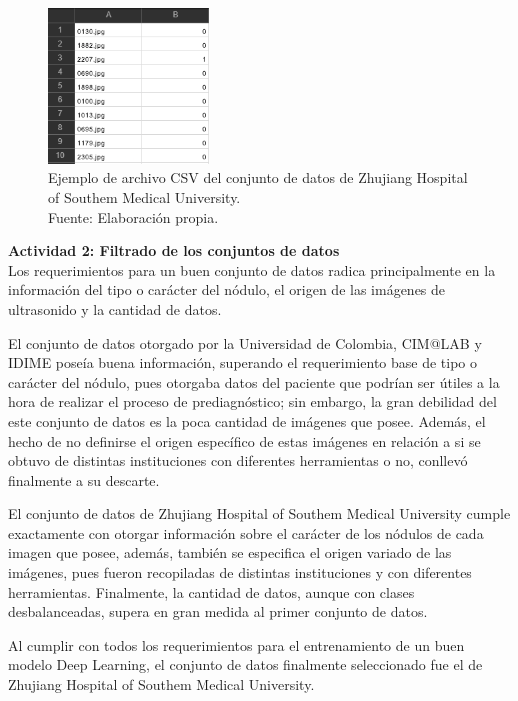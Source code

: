 \begin{figure}[H]
	\begin{center}
		\includegraphics[width=0.38\textwidth]{4/figures/tn3k_csv.PNG}
		\caption[Ejemplo de archivo CSV del conjunto de datos de Zhujiang Hospital of Southem Medical University]{Ejemplo de archivo CSV del conjunto de datos de Zhujiang Hospital of Southem Medical University. \\
		Fuente: Elaboración propia.}
		\label{4:fig105}
	\end{center}
\end{figure}

\textbf{Actividad 2: Filtrado de los conjuntos de datos}
\\
Los requerimientos para un buen conjunto de datos radica principalmente en la información del tipo o carácter del nódulo, el origen de las imágenes de ultrasonido y la cantidad de datos.

El conjunto de datos otorgado por la Universidad de Colombia, CIM@LAB y IDIME poseía buena información, superando el requerimiento base de tipo o carácter del nódulo, pues otorgaba datos del paciente que podrían ser útiles a la hora de realizar el proceso de prediagnóstico; sin embargo, la gran debilidad del este conjunto de datos es la poca cantidad de imágenes que posee. Además, el hecho de no definirse el origen específico de estas imágenes en relación a si se obtuvo de distintas instituciones con diferentes herramientas o no, conllevó finalmente a su descarte.

El conjunto de datos de Zhujiang Hospital of Southem Medical University cumple exactamente con otorgar información sobre el carácter de los nódulos de cada imagen que posee, además, también se especifica el origen variado de las imágenes, pues fueron recopiladas de distintas instituciones y con diferentes herramientas. Finalmente, la cantidad de datos, aunque con clases desbalanceadas, supera en gran medida al primer conjunto de datos.

Al cumplir con todos los requerimientos para el entrenamiento de un buen modelo Deep Learning, el conjunto de datos finalmente seleccionado fue el de Zhujiang Hospital of Southem Medical University.

